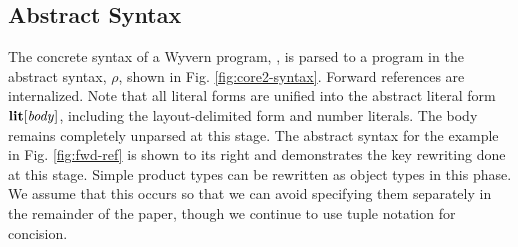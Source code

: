 \subsection{Abstract Syntax}
The concrete syntax of a Wyvern program, , is parsed to a program in the abstract syntax, $\rho$, shown in Fig. \ref{fig:core2-syntax}. Forward references are internalized. Note that all literal forms are unified into the abstract literal form $\textbf{lit}[\mathit{body}]$, including the layout-delimited form and number literals. The body remains completely unparsed at this stage. The abstract syntax for the example in Fig. \ref{fig:fwd-ref} is shown to its right and demonstrates the key rewriting done at this stage. Simple product types can be rewritten as object types in this phase. We assume that this occurs so that we can avoid specifying them separately in the remainder of the paper, though we continue to use tuple notation for concision.
\newcommand{\ih}{\hat{e}}
